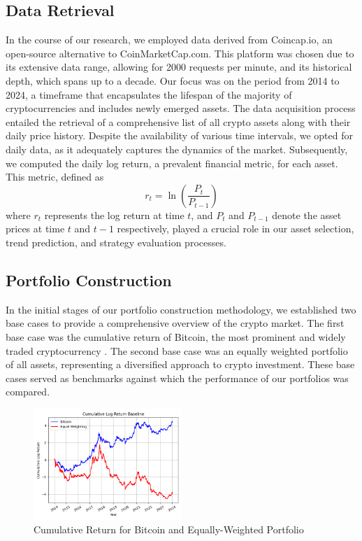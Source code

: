 \documentclass[journal]{IEEEtran}
\begin{document}
\subsection{Data Retrieval}
In the course of our research, we employed data derived from Coincap.io, an open-source alternative to CoinMarketCap.com. This platform was chosen due to its extensive data range, allowing for 2000 requests per minute, and its historical depth, which spans up to a decade. Our focus was on the period from 2014 to 2024, a timeframe that encapsulates the lifespan of the majority of cryptocurrencies and includes newly emerged assets. The data acquisition process entailed the retrieval of a comprehensive list of all crypto assets along with their daily price history. Despite the availability of various time intervals, we opted for daily data, as it adequately captures the dynamics of the market. Subsequently, we computed the daily log return, a prevalent financial metric, for each asset. This metric, defined as 
\[
r_t = \ln \left( \frac{P_t}{P_{t-1}} \right)
\]
where $r_t$ represents the log return at time $t$, and $P_t$ and $P_{t-1}$ denote the asset prices at time $t$ and $t-1$ respectively, played a crucial role in our asset selection, trend prediction, and strategy evaluation processes\cite{gupta2024forecasting}.

\subsection{Portfolio Construction}
In the initial stages of our portfolio construction methodology, we established two base cases to provide a comprehensive overview of the crypto market. The first base case was the cumulative return of Bitcoin, the most prominent and widely traded cryptocurrency \cite{chan2002artificial}. The second base case was an equally weighted portfolio of all assets, representing a diversified approach to crypto investment. These base cases served as benchmarks against which the performance of our portfolios was compared.



\begin{figure}[h]
\centering
\includegraphics[width=0.5\textwidth]{tex/images/benchmark.png}
\caption{Cumulative Return for Bitcoin and Equally-Weighted Portfolio}
\label{fig:benchmark}
\end{figure}
\end{document}
